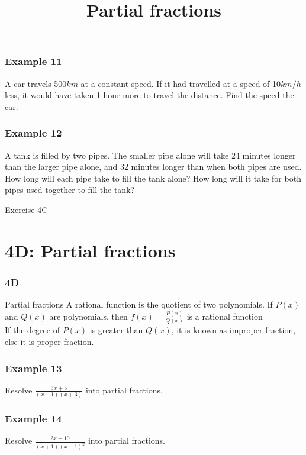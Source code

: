 \documentclass{beamer}
\begin{document}
\begin{frame}[t]
    \frametitle{Example 11}
    A car travels 500$km$ at a constant speed. If it had travelled at a speed of 10$km/h$ less, it would have taken 1 hour 
    more to travel the distance. Find the speed the car.
\end{frame}

\begin{frame}[t]
    \frametitle{Example 12}
    A tank is filled by two pipes. The smaller pipe alone will take 24 minutes longer than the larger pipe alone, and 32 minutes longer than 
    when both pipes are used. How long will each pipe take to fill the tank alone? How long will it take for both pipes used together to fill the tank?
\end{frame}
\begin{frame}
\end{frame}

\begin{frame}{Exercise 4C}
\end{frame}
\section{4D: Partial fractions}
\begin{frame} 
    \frametitle{4D}
    \begin{center}
        \title{Partial fractions}
        \maketitle
    \end{center}
\end{frame}

\begin{frame}{Partial fractions}
    A rational function is the quotient of two polynomials. If $P(x)$ and $Q(x)$ are polynomials, then $f(x) = \frac{P(x)}{Q(x)}$ is a rational function\\
    If the degree of $P(x)$ is greater than $Q(x)$, it is known as improper fraction, else it is proper fraction.
\end{frame}

\begin{frame}[t]
    \frametitle{Example 13}
    Resolve $\frac{3x + 5}{(x-1)(x+3)}$ into partial fractions.
\end{frame}

\begin{frame}[t]
    \frametitle{Example 14}
    Resolve $\frac{2x + 10}{(x+1)(x-1)^2}$ into partial fractions.
\end{frame}
\begin{frame}
\end{frame}
\end{document}
